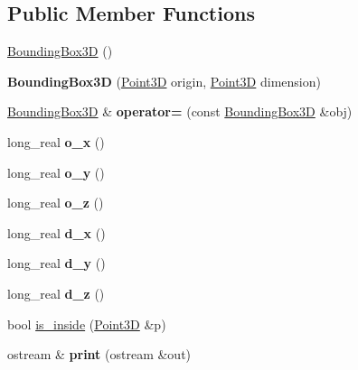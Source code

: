 \subsection*{Public Member Functions}
\begin{DoxyCompactItemize}
\item 
\hyperlink{classez_1_1maths_1_1BoundingBox3D_a81a912b95fbb8c30afd2550ef8b77f61}{Bounding\+Box3D} ()
\item 
\mbox{\label{classez_1_1maths_1_1BoundingBox3D_a92da1569fe2f3d46a08876d1f627be25}} 
{\bfseries Bounding\+Box3D} (\hyperlink{classez_1_1maths_1_1Point3D}{Point3D} origin, \hyperlink{classez_1_1maths_1_1Point3D}{Point3D} dimension)
\item 
\mbox{\label{classez_1_1maths_1_1BoundingBox3D_a65def50508834c47c7cd12feb5aaaaa2}} 
\hyperlink{classez_1_1maths_1_1BoundingBox3D}{Bounding\+Box3D} \& {\bfseries operator=} (const \hyperlink{classez_1_1maths_1_1BoundingBox3D}{Bounding\+Box3D} \&obj)
\item 
\mbox{\label{classez_1_1maths_1_1BoundingBox3D_abf08015dca3aeb42e8d0348b221885a4}} 
long\+\_\+real {\bfseries o\+\_\+x} ()
\item 
\mbox{\label{classez_1_1maths_1_1BoundingBox3D_adaa6f2b45fb82aab1d513bf5c3380579}} 
long\+\_\+real {\bfseries o\+\_\+y} ()
\item 
\mbox{\label{classez_1_1maths_1_1BoundingBox3D_a5a4364a3614aacaaf19169439ff0216b}} 
long\+\_\+real {\bfseries o\+\_\+z} ()
\item 
\mbox{\label{classez_1_1maths_1_1BoundingBox3D_a07490c368d321b10191295310bda6605}} 
long\+\_\+real {\bfseries d\+\_\+x} ()
\item 
\mbox{\label{classez_1_1maths_1_1BoundingBox3D_a8169a716fbdfd8321dd0b11fe95c1635}} 
long\+\_\+real {\bfseries d\+\_\+y} ()
\item 
\mbox{\label{classez_1_1maths_1_1BoundingBox3D_a82d4fae5feb0c8bb93dcb44ad5d38356}} 
long\+\_\+real {\bfseries d\+\_\+z} ()
\item 
bool \hyperlink{classez_1_1maths_1_1BoundingBox3D_ab69a5ee522212f8b8c0bf8ab7368620c}{is\+\_\+inside} (\hyperlink{classez_1_1maths_1_1Point3D}{Point3D} \&p)
\item 
\mbox{\label{classez_1_1maths_1_1BoundingBox3D_aa22da905a92088ee3ef4772164b19a4d}} 
ostream \& {\bfseries print} (ostream \&out)
\end{DoxyCompactItemize}
